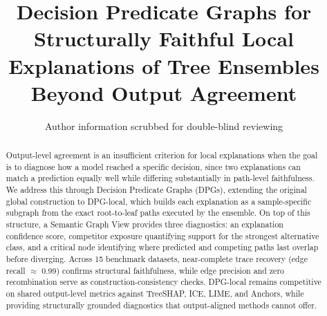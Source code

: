 \documentclass[runningheads]{llncs}
\begin{document}
\title{%
Decision Predicate Graphs for Structurally Faithful Local Explanations of Tree Ensembles Beyond Output Agreement}



\author{Author information scrubbed for double-blind reviewing}
\institute{}

\maketitle
\begin{abstract} %
  Output-level agreement is an insufficient criterion for local explanations when the goal is to diagnose how a model reached a specific decision, since two explanations can match a prediction equally well while differing substantially in path-level faithfulness. We address this through Decision Predicate Graphs (DPGs), extending the original global construction to DPG-local, which builds each explanation as a sample-specific subgraph from the exact root-to-leaf paths executed by the ensemble. On top of this structure, a Semantic Graph View provides three diagnostics: an explanation confidence score, competitor exposure quantifying support for the strongest alternative class, and a critical node identifying where predicted and competing paths last overlap before diverging. Across 15 benchmark datasets, near-complete trace recovery (edge recall $\approx$ 0.99) confirms structural faithfulness, while edge precision and zero recombination serve as construction-consistency checks. DPG-local remains competitive on shared output-level metrics against TreeSHAP, ICE, LIME, and Anchors, while providing structurally grounded diagnostics that output-aligned methods cannot offer.
\end{abstract}
\end{document}
